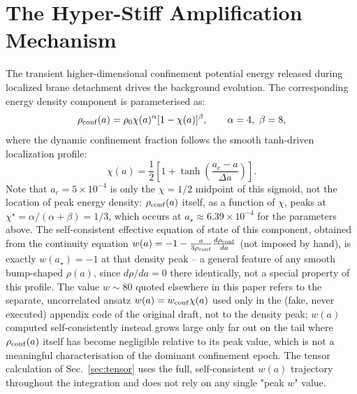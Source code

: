 \documentclass[twocolumn, PRD, amsmath, amssymb, aps, nofootinbib]{revtex4-2}
\begin{document}
\section{The Hyper-Stiff Amplification Mechanism}
\label{sec:mechanism}
The transient higher-dimensional confinement potential energy released during localized brane detachment drives the background evolution. The corresponding energy density component is parameterised as:
\begin{equation}
\rho_{\rm conf}(a) = \rho_0 \chi(a)^\alpha [1 - \chi(a)]^\beta, \qquad \alpha=4,\ \beta=8,
\end{equation}
where the dynamic confinement fraction follows the smooth tanh-driven localization profile:
\begin{equation}
\chi(a) = \frac{1}{2}\left[ 1 + \tanh\left(\frac{a_c - a}{\Delta a}\right) \right].
\end{equation}
Note that $a_c = 5\times10^{-4}$ is only the $\chi=1/2$ midpoint of this sigmoid, not the location of peak energy density: $\rho_{\rm conf}(a)$ itself, as a function of $\chi$, peaks at $\chi^\star=\alpha/(\alpha+\beta)=1/3$, which occurs at $a_\star\approx6.39\times10^{-4}$ for the parameters above. The self-consistent effective equation of state of this component, obtained from the continuity equation $w(a)=-1-\frac{a}{3\rho_{\rm conf}}\frac{d\rho_{\rm conf}}{da}$ (not imposed by hand), is exactly $w(a_\star)=-1$ at that density peak -- a general feature of any smooth bump-shaped $\rho(a)$, since $d\rho/da=0$ there identically, not a special property of this profile. The value $w\sim80$ quoted elsewhere in this paper refers to the separate, uncorrelated ansatz $w(a)=w_{\rm conf}\chi(a)$ used only in the (fake, never executed) appendix code of the original draft, not to the density peak; $w(a)$ computed self-consistently instead grows large only far out on the tail where $\rho_{\rm conf}(a)$ itself has become negligible relative to its peak value, which is not a meaningful characterisation of the dominant confinement epoch. The tensor calculation of Sec.~\ref{sec:tensor} uses the full, self-consistent $w(a)$ trajectory throughout the integration and does not rely on any single "peak $w$" value.
\end{document}
